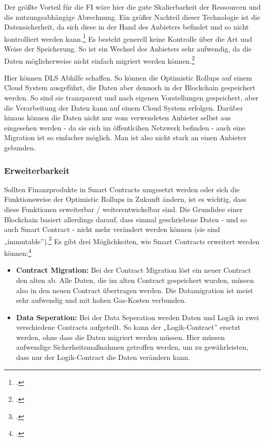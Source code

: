 \documentclass[12pt, a4paper]{article}
\begin{document}
{\noindent
Der größte Vorteil für die FI wäre hier die gute Skalierbarkeit der Ressourcen und die nutzungsabhängige Abrechnung.
\bigbreak
\noindent
Ein größer Nachteil dieser Technologie ist die Datensicherheit, da sich diese in der Hand des Anbieters befindet und so nicht kontrolliert werden kann.\footcite[Vgl. hierzu und zum Folgenden][99]{q10}
Es besteht generell keine Kontrolle über die Art und Weise der Speicherung.
So ist ein Wechsel des Anbieters sehr aufwendig, da die Daten möglicherweise nicht einfach migriert werden können.\footcite[Vgl.][]{w28}

\noindent
Hier können DLS Abhilfe schaffen.
So können die Optimistic Rollups auf einem Cloud System ausgeführt, die Daten aber dennoch in der Blockchain gespeichert werden.
So sind sie tranzparent und nach eigenen Vorstellungen gespeichert, aber die Verarbeitung der Daten kann auf einem Cloud System erfolgen.
Darüber hinaus können die Daten nicht nur vom verwendeten Anbieter selbst aus eingesehen werden - da sie sich im öffentlcihen Netzwerk befinden - auch eine Migration ist so einfacher möglich.
Man ist also nicht stark an einen Anbieter gebunden.

\subsubsection{Erweiterbarkeit}
\label{sec:Erweiterbarkeit}

Sollten Finanzprodukte in Smart Contracts umgesetzt werden oder sich die Funktionsweise der Optimistic Rollups in Zukunft ändern, ist es wichtig, dass diese Funktionen erweiterbar / weiterentwickelbar sind.
Die Grundidee einer Blockchain basiert allerdings darauf, dass einmal geschriebene Daten - und so auch Smart Contract - nicht mehr verändert werden können (sie sind „immutable”).\footcite[Vgl.][]{w30}
Es gibt drei Möglichkeiten, wie Smart Contracts erweitert werden können:\footcite[Vgl. hierzu und zum Folgenden sowie weiterführend][]{w29}
\begin{itemize}
    \item \textbf{Contract Migration:}
    Bei der Contract Migration löst ein neuer Contract den alten ab.
    Alle Daten, die im alten Contract gespeichert wurden, müssen also in den neuen Contract übertragen werden.
    Die Datamigration ist meist sehr aufwendig und mit hohen Gas-Kosten verbunden.

    \item \textbf{Data Seperation:}
    Bei der Data Seperation werden Daten und Logik in zwei verschiedene Contracts aufgeteilt.
    So kann der „Logik-Contract” ersetzt werden, ohne dass die Daten migriert werden müssen.
    Hier müssen aufwendige Sicherheitsmaßnahmen getroffen werden, um zu gewährleisten, dass nur der Logik-Contract die Daten verändern kann.


\end{itemize}}
\end{document}
